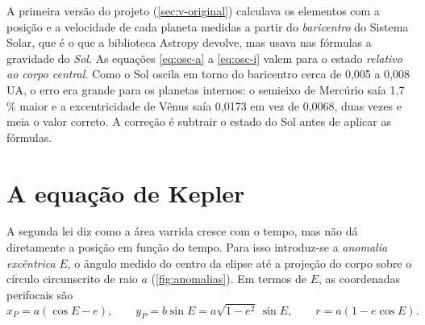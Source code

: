 \begin{licao}
A primeira versão do projeto (\autoref{sec:v-original}) calculava os elementos com a posição e a velocidade de cada planeta medidas a partir do \emph{baricentro} do Sistema Solar, que é o que a biblioteca Astropy devolve, mas usava nas fórmulas a gravidade do \emph{Sol}. As equações \eqref{eq:osc-a} a \eqref{eq:osc-i} valem para o estado \emph{relativo ao corpo central}. Como o Sol oscila em torno do baricentro cerca de 0,005 a 0,008\,UA, o erro era grande para os planetas internos: o semieixo de Mercúrio saía 1,7\,\% maior e a excentricidade de Vênus saía 0,0173 em vez de 0,0068, duas vezes e meia o valor correto. A correção é subtrair o estado do Sol antes de aplicar as fórmulas.
\end{licao}

\section{A equação de Kepler}\label{sec:kepler}

A segunda lei diz como a área varrida cresce com o tempo, mas não dá diretamente a posição em função do tempo. Para isso introduz-se a \emph{anomalia excêntrica} $E$, o ângulo medido do centro da elipse até a projeção do corpo sobre o círculo circunscrito de raio $a$ (\autoref{fig:anomalias}). Em termos de $E$, as coordenadas perifocais são
\begin{equation}
  x_P = a(\cos E - e),\qquad y_P = b\sin E = a\sqrt{1-e^2}\,\sin E,\qquad r = a(1 - e\cos E).
  \label{eq:perifocal}
\end{equation}

